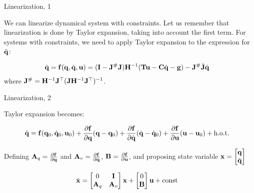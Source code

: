 \documentclass{beamer}
\begin{document}
\begin{frame}{Linearization, 1}
	\begin{flushleft}
		
		We can linearize dynamical system with constraints. Let us remember that linearization is done by Taylor expansion, taking into account the first term. For systems with constraints, we need to apply Taylor expansion to the expression for $\ddot{\mathbf{q}}$: 
		
		\begin{align}
			\ddot{\mathbf{q}}
			=
			\mathbf{f}(\mathbf{q},  \dot{\mathbf{q}}, \mathbf{u})
			=
			(\mathbf{I}-\mathbf{J}^\# \mathbf{J})
			\mathbf{H}^{-1}(\mathbf{T}\mathbf{u} - \mathbf{C} \dot{\mathbf{q}} - \mathbf{g})
			-
			\mathbf{J}^\# \dot{\mathbf{J}} \dot{\mathbf{q}}
		\end{align}
	where $\mathbf{J}^\# = \mathbf{H}^{-1} \mathbf{J}^\top ( \mathbf{J} \mathbf{H}^{-1} \mathbf{J}^\top )^{-1}$.
		
	\end{flushleft}
\end{frame}



\begin{frame}{Linearization, 2}
	\begin{flushleft}
		
		Taylor expansion becomes:
		
		\begin{align*}
			\ddot{\mathbf{q}}
			=
			\mathbf{f}(\mathbf{q}_0,  \dot{\mathbf{q}}_0, \mathbf{u}_0)
			+
			\frac{\partial \mathbf{f}}{\partial \mathbf{q}}
			(\mathbf{q}-\mathbf{q}_0)
			+
			\frac{\partial \mathbf{f}}{\partial \dot{\mathbf{q}}}
			(\dot{\mathbf{q}}-\dot{\mathbf{q}}_0)
			+
			\frac{\partial \mathbf{f}}{\partial \mathbf{u}}
			(\mathbf{u}-\mathbf{u}_0)
			+
			\text{h.o.t.}
		\end{align*}
	
		Defining $\mathbf{A}_q = \frac{\partial \mathbf{f}}{\partial \mathbf{q}}$ and $\mathbf{A}_v = \frac{\partial \mathbf{f}}{\partial \dot{\mathbf{q}}}$, $\mathbf{B} = \frac{\partial \mathbf{f}}{\partial \mathbf{u}}$, and proposing state variable $\mathbf{x} = \begin{bmatrix}
			\mathbf{q} \\ \dot{\mathbf{q}}
		\end{bmatrix}$
	
	\begin{align}
		\dot{\mathbf{x}} = 
		\begin{bmatrix}
			0 & \mathbf{I} \\
			\mathbf{A}_q & \mathbf{A}_v
		\end{bmatrix}
	\mathbf{x}
	+
	\begin{bmatrix}
		0 \\
		\mathbf{B}
	\end{bmatrix}
	\mathbf{u}
	+
	\text{const}
	\end{align}
		
	\end{flushleft}
\end{frame}
\end{document}
